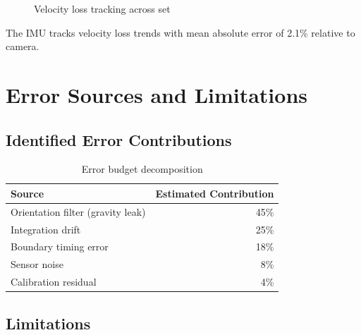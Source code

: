 \begin{figure}[h]
    \centering
    \caption{Velocity loss tracking across set}
    \label{fig:velocity_loss}
\end{figure}

The IMU tracks velocity loss trends with mean absolute error of 2.1\% relative to camera.

\section{Error Sources and Limitations}

\subsection{Identified Error Contributions}

\begin{table}[h]
    \centering
    \caption{Error budget decomposition}
    \label{tab:error_budget}
    \begin{tabular}{lr}
        \toprule
        \textbf{Source} & \textbf{Estimated Contribution} \\
        \midrule
        Orientation filter (gravity leak) & 45\% \\
        Integration drift & 25\% \\
        Boundary timing error & 18\% \\
        Sensor noise & 8\% \\
        Calibration residual & 4\% \\
        \bottomrule
    \end{tabular}
\end{table}

\subsection{Limitations}

